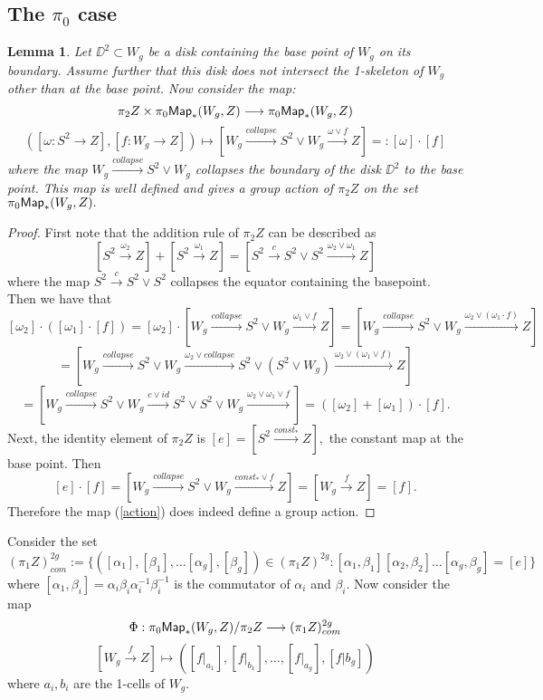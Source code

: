 \documentclass{amsart}
\newtheorem{lemma}[theorem]{Lemma}
\theoremstyle{definition}
\theoremstyle{remark}
\newcommand{\xra}{\xrightarrow}
\begin{document}
\subsection{The $\pi_{0}$ case}
\begin{lemma}
Let $\DD^{2} \subset W_{g}$ be a disk containing the base point of $W_{g}$ on its boundary. Assume further that this disk does not intersect the 1-skeleton of $W_{g}$ other than at the base point. Now consider the map: 
$$\pi_{2}Z \times \pi_{0}{\sf Map}_{\ast}(W_{g}, Z) \longrightarrow \pi_{0}{\sf Map}_{\ast}(W_{g}, Z)$$
\begin{equation} \label{action}([\omega: S^{2} \rightarrow Z], [f: W_{g} \rightarrow Z]) \mapsto [W_{g} \xra{collapse} S^{2} \vee W_{g} \xra{\omega \vee f} Z] =: [\omega] \cdot [f] \end{equation}
where the map $W_{g} \xra{collapse} S^{2} \vee W_{g}$ collapses the boundary of the disk $\DD^{2}$ to the base point. This map is well defined and gives a group action of $\pi_{2}Z$ on the set $\pi_{0}{\sf Map}_{\ast}(W_{g}, Z).$
\end{lemma}
\begin{proof}
First note that the addition rule of $\pi_{2}Z$ can be described as 
$$[S^{2} \xra{\omega_{2}} Z] + [S^{2} \xra{\omega_{1}} Z] = [S^{2} \xra{c} S^{2} \vee S^{2} \xra{\omega_{2} \vee \omega_{1}} Z]$$ where the map $S^{2} \xra{c} S^{2} \vee S^{2}$ collapses the equator containing the basepoint. Then we have that 
$$ 
[\omega_{2}] \cdot ([\omega_{1}] \cdot [f]) = [\omega_{2}] \cdot [W_{g} \xra{collapse} S^{2} \vee W_{g} \xra{\omega_{1} \vee f} Z] = [W_{g} \xra{collapse} S^{2} \vee W_{g} \xra{\omega_{2} \vee (\omega_{1} \cdot f)} Z]
$$
$$
= [W_{g} \xra{collapse} S^{2} \vee W_{g} \xra{\omega_{2} \vee collapse} S^{2} \vee (S^{2} \vee W_{g}) \xra{\omega_{2} \vee (\omega_{1} \vee f)} Z]
$$
$$= [W_{g} \xra{collapse} S^{2} \vee W_{g} \xra{c \vee id} S^{2} \vee S^{2} \vee W_{g} \xra{\omega_{2} \vee \omega_{1} \vee f}] = ([\omega_{2}] + [\omega_{1}]) \cdot [f].
$$
Next, the identity element of $\pi_{2}Z$ is $[e] = [S^{2} \xra{const_{*}} Z],$ the constant map at the base point. Then
$$
[e] \cdot [f] = [W_{g} \xra{collapse} S^{2} \vee W_{g} \xra{const_{*} \vee f} Z] = [W_{g} \xra{f} Z] = [f]. 
$$ Therefore the map (\ref{action}) does indeed define a group action.
\end{proof}

\noindent Consider the set $$(\pi_{1}Z)^{2g}_{com} := \{ ([\alpha_{1}], [\beta_{1}], \hdots [\alpha_{g}], [\beta_{g}]) \in (\pi_{1}Z)^{2g} : [\alpha_{1}, \beta_{1}][\alpha_{2}, \beta_{2}]\hdots[\alpha_{g}, \beta_{g}] = [e] \}$$ where $[\alpha_{1}, \beta_{i}] = \alpha_{i}\beta_{i}\alpha_{i}^{-1}\beta_{i}^{-1}$ is the commutator of $\alpha_{i}$ and $\beta_{i}$. Now consider the map
$$
\Phi: \pi_{0}{\sf Map}_{\ast}(W_{g}, Z)/\pi_{2}Z \longrightarrow (\pi_{1}Z)^{2g}_{com}
$$
\begin{equation}\label{e1}
[W_{g} \xra{f} Z] \mapsto ([f|_{a_{1}}], [f|_{b_{1}}], \hdots, [f|_{a_{g}}], [f|b_{g}])
\end{equation}
where $a_{i}, b_{i}$ are the 1-cells of $W_{g}.$ 
\end{document}

